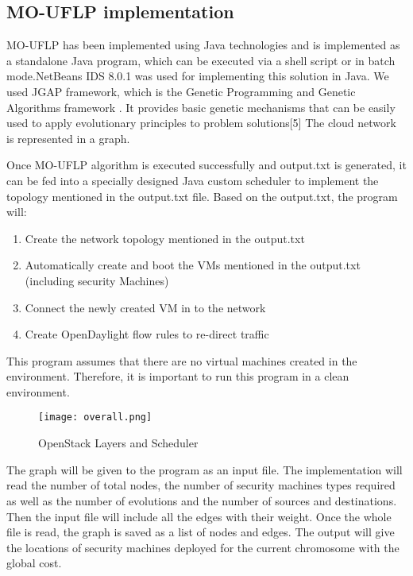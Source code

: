 \documentclass{article}
\begin{document}
\subsection{MO-UFLP implementation}
MO-UFLP has been implemented using Java technologies and is implemented as a standalone Java program, which can be executed  via a shell script or in batch mode.NetBeans IDS 8.0.1 was used for implementing this solution in Java. We used JGAP framework, which is the Genetic Programming and Genetic Algorithms framework . It provides basic genetic mechanisms that can be easily used to apply evolutionary principles to problem solutions[5]
The cloud network is represented in a graph.

Once MO-UFLP algorithm is executed successfully and output.txt is generated, it can be fed into a specially designed Java custom scheduler to implement the topology mentioned in the output.txt file. Based on the output.txt, the program will:\\


\begin{enumerate}
	\item 	Create the network topology mentioned in the output.txt
	\item 	Automatically create and boot the VMs mentioned in the output.txt (including security Machines)
	\item 	Connect the newly created VM in to the network
	\item 	Create OpenDaylight flow rules to re-direct traffic
\end{enumerate}
This program assumes that there are no virtual machines created in the environment. Therefore, it is important to run this program in a clean environment.
\begin{figure}[h]
	\caption{OpenStack Layers and Scheduler}
	\centering
	\texttt{[image: overall.png]}
\end{figure}

The graph will be given to the program as an input file. The implementation will read the number of total nodes, the number of security machines types required as well as the number of evolutions and the number of sources and destinations. Then the input file will include all the edges with their weight. Once the whole file is read, the graph is saved as a list of nodes and edges. The output will give the locations of security machines deployed for the current chromosome with the global cost. 
\end{document}

